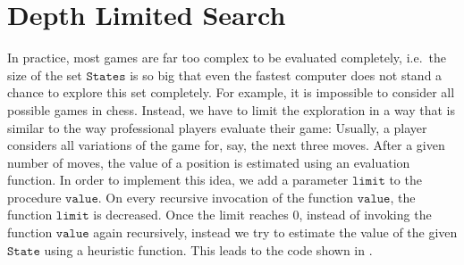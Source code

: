\section{Depth Limited Search}
In practice, most games are far too complex to be evaluated completely, i.e.~the size of the set
$\texttt{States}$ is so big that even the fastest computer does not stand a chance to explore this set
completely.  For example, it is impossible to consider all possible games in chess.  Instead, we have to limit
the exploration in a way that is similar to the way professional players evaluate their game:  Usually, a
player considers all variations of the game for, say, the next three moves.  After a given number of moves, the
value of a position is estimated using an evaluation function.  In order to implement this idea, we add a
parameter $\texttt{limit}$ to the procedure $\texttt{value}$.  On every recursive invocation 
of the function $\texttt{value}$, the function $\texttt{limit}$ is decreased.  Once the limit reaches $0$,
instead of invoking the function $\texttt{value}$ again recursively, instead we try to estimate the value of
the given $\texttt{State}$ using a heuristic function.  This leads to the code shown in .


